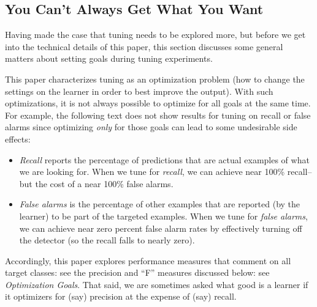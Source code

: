 \documentclass[final,twocolumn,5p]{elsarticle}
\newcommand{\bi}{\begin{itemize}[leftmargin=0.4cm]}
\newcommand{\ei}{\end{itemize}}
\newcommand{\fig}[1]{Figure~\ref{fig:#1}}
\begin{document}
 


 
 \subsection{You Can't Always Get What You Want}\label{sect:goals}
 
 Having made the case that tuning needs to be explored more,
 but before we get into the technical details of this
 paper, this section discusses some
 general matters about setting goals during tuning
 experiments.
 
 This paper characterizes tuning as an optimization problem (how to change the settings on the learner
 in order to best improve the output).
With such optimizations,  it is not always possible to optimize for all goals at the same time.
For example, the following text does not
show results for tuning on recall
or false alarms since optimizing {\em only} for those goals can lead
to some undesirable side effects:
\bi
\item
{\em Recall} reports the percentage of  predictions that are actual examples of  what we are looking for.
When we tune for {\em recall}, we can achieve near
100\% recall-- but the cost of a near 100\% false alarms.
\item
{\em False alarms} is the percentage of other examples that are reported  (by the learner)
to be part of the targeted examples.
When we tune for {\em false alarms}, we 
can achieve near zero percent false alarm rates by effectively turning off
the detector (so the  recall falls to nearly zero).
\ei
Accordingly,  this paper  explores performance measures that comment on all 
target classes: see the  precision and ``F'' measures discussed below: see {\em Optimization Goals}.
That said, we are sometimes asked what good is a learner if it optimizers for (say) precision
at the expense of (say) recall. 
\end{document}
